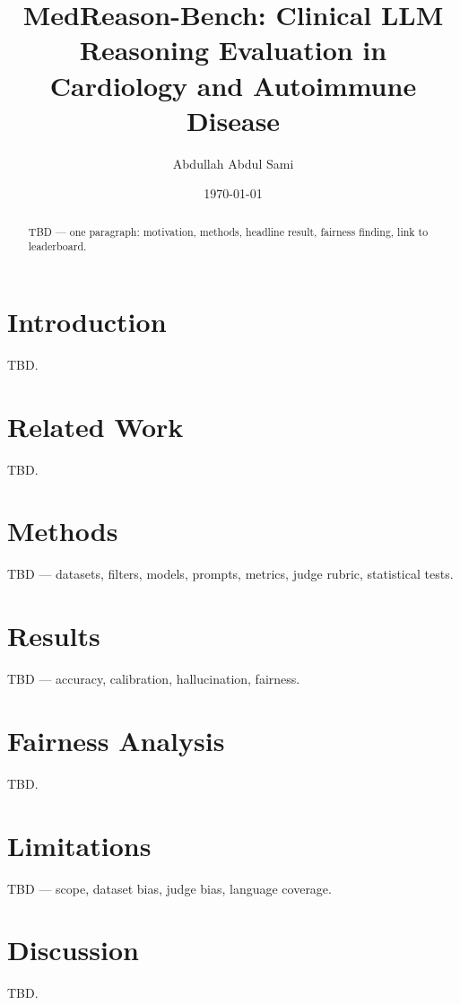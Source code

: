 \documentclass[11pt,a4paper]{article}
\title{MedReason-Bench: Clinical LLM Reasoning Evaluation in Cardiology and Autoimmune Disease}
\author{Abdullah Abdul Sami}
\date{\today}
\begin{document}
\maketitle

\begin{abstract}
TBD --- one paragraph: motivation, methods, headline result, fairness finding, link to leaderboard.
\end{abstract}

\section{Introduction}
TBD.

\section{Related Work}
TBD.

\section{Methods}
TBD --- datasets, filters, models, prompts, metrics, judge rubric, statistical tests.

\section{Results}
TBD --- accuracy, calibration, hallucination, fairness.

\section{Fairness Analysis}
TBD.

\section{Limitations}
TBD --- scope, dataset bias, judge bias, language coverage.

\section{Discussion}
TBD.



\end{document}
